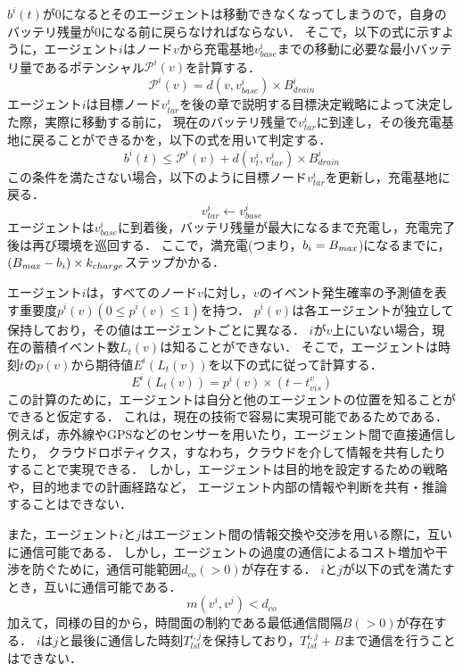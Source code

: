 \documentclass[12pt,a4j,twoside]{jarticle}
\def\BatteryMax{{B_{\it max}}}
\def\BatteryLevel{b}
\begin{document}
$b^i(t)$が0になるとそのエージェントは移動できなくなってしまうので，自身のバッテリ残量が0になる前に戻らなければならない．
そこで，以下の式に示すように，エージェント$i$はノード$v$から充電基地$v^i_{base}$までの移動に必要な最小バッテリ量であるポテンシャル$\mathcal{P}^i(v)$を計算する．
%
\begin{equation}
  \mathcal{P}^i(v) = d(v, v^i_{base}) \times B^i_{drain}
\end{equation}
%
エージェント$i$は目標ノード$v^i_{tar}$を後の章で説明する目標決定戦略によって決定した際，実際に移動する前に，
現在のバッテリ残量で$v^i_{tar}$に到達し，その後充電基地に戻ることができるかを，以下の式を用いて判定する．
%
\begin{equation}
  b^i(t) \leq \mathcal{P}^i(v) + d(v^i_t, v^i_{tar}) \times B^i_{drain}
\end{equation}
%
この条件を満たさない場合，以下のように目標ノード$v^i_{tar}$を更新し，充電基地に戻る．
%
\begin{equation}
  v^i_{tar} \gets v^i_{base}
\end{equation}
%
エージェントは$v^i_{base}$に到着後，バッテリ残量が最大になるまで充電し，充電完了後は再び環境を巡回する．
ここで，満充電(つまり，$\BatteryLevel_i=\BatteryMax$)になるまでに，
$(\BatteryMax-\BatteryLevel_i)\times k_{charge}$ステップかかる．
\par

エージェント$i$は，すべてのノード$v$に対し，$v$のイベント発生確率の予測値を表す重要度$p^i(v) (0 \leq p^i(v) \leq 1)$を持つ．
$p^i(v)$は各エージェントが独立して保持しており，その値はエージェントごとに異なる．
$i$が$v$上にいない場合，現在の蓄積イベント数$L_t(v)$は知ることができない．
そこで，エージェントは時刻$t$の$p(v)$から期待値$E^i(L_t(v))$を以下の式に従って計算する．
%
\begin{equation}
  E^i(L_t(v)) = p^i(v) \times (t - t^v_{vis})
\end{equation}
%
この計算のために，エージェントは自分と他のエージェントの位置を知ることができると仮定する．
これは，現在の技術で容易に実現可能であるためである．
例えば，赤外線やGPSなどのセンサーを用いたり，エージェント間で直接通信したり，
クラウドロボティクス，すなわち，クラウドを介して情報を共有したりすることで実現できる．
しかし，エージェントは目的地を設定するための戦略や，目的地までの計画経路など，
エージェント内部の情報や判断を共有・推論することはできない．
\par

また，エージェント$i$と$j$はエージェント間の情報交換や交渉を用いる際に，互いに通信可能である．
しかし，エージェントの過度の通信によるコスト増加や干渉を防ぐために，通信可能範囲$d_{co}(>0)$が存在する．
$i$と$j$が以下の式を満たすとき，互いに通信可能である．
%
\begin{equation}
  m(v^i, v^j) < d_{co}
\end{equation}
%
加えて，同様の目的から，時間面の制約である最低通信間隔$B(>0)$が存在する．
$i$は$j$と最後に通信した時刻$T^{i, j}_{lst}$を保持しており，$T^{i, j}_{lst} + B$まで通信を行うことはできない．
\par
\end{document}
